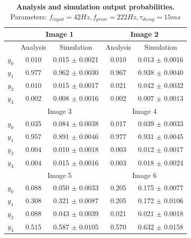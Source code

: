 \begin{table}[]
\label{tab:1D_42_222_15}
\small
\tabcolsep=0.11cm
\begin{tabular}{|c|cc|cc|}
\hline
                       & \multicolumn{2}{c|}{Image 1}                       & \multicolumn{2}{c|}{Image 2}                       \\ \hline
                       & \multicolumn{1}{c|}{Analysis} & Simulation         & \multicolumn{1}{c|}{Analysis} & Simulation         \\ \hline
$y_0$                  & \multicolumn{1}{c|}{0.010}    & 0.015 $\pm$ 0.0021 & \multicolumn{1}{c|}{0.010}    & 0.013 $\pm$ 0.0016 \\ \hline
$y_1$                  & \multicolumn{1}{c|}{0.977}    & 0.962 $\pm$ 0.0030 & \multicolumn{1}{c|}{0.967}    & 0.938 $\pm$ 0.0040 \\ \hline
$y_2$                  & \multicolumn{1}{c|}{0.010}    & 0.015 $\pm$ 0.0017 & \multicolumn{1}{c|}{0.021}    & 0.042 $\pm$ 0.0032 \\ \hline
$y_3$                  & \multicolumn{1}{c|}{0.002}    & 0.008 $\pm$ 0.0016 & \multicolumn{1}{c|}{0.002}    & 0.007 $\pm$ 0.0013 \\ \hline
                       & \multicolumn{2}{c|}{Image 3}                       & \multicolumn{2}{c|}{Image 4}                       \\ \hline
$y_0$                  & \multicolumn{1}{c|}{0.035}    & 0.084 $\pm$ 0.0038 & \multicolumn{1}{c|}{0.017}    & 0.039 $\pm$ 0.0033 \\ \hline
$y_1$                  & \multicolumn{1}{c|}{0.957}    & 0.891 $\pm$ 0.0046 & \multicolumn{1}{c|}{0.977}    & 0.931 $\pm$ 0.0045 \\ \hline
$y_2$                  & \multicolumn{1}{c|}{0.004}    & 0.010 $\pm$ 0.0018 & \multicolumn{1}{c|}{0.003}    & 0.012 $\pm$ 0.0017 \\ \hline
$y_3$                  & \multicolumn{1}{c|}{0.004}    & 0.015 $\pm$ 0.0016 & \multicolumn{1}{c|}{0.003}    & 0.018 $\pm$ 0.0024 \\ \hline
						& \multicolumn{2}{c|}{Image 5}                       & \multicolumn{2}{c|}{Image 6}                       \\ \hline
$y_0$                  & \multicolumn{1}{c|}{0.088}    & 0.050 $\pm$ 0.0033 & \multicolumn{1}{c|}{0.205}    & 0.175 $\pm$ 0.0077 \\ \hline
$y_1$                  & \multicolumn{1}{c|}{0.308}    & 0.321 $\pm$ 0.0087 & \multicolumn{1}{c|}{0.205}    & 0.172 $\pm$ 0.0106 \\ \hline
$y_2$                  & \multicolumn{1}{c|}{0.088}    & 0.043 $\pm$ 0.0039 & \multicolumn{1}{c|}{0.021}    & 0.021 $\pm$ 0.0018 \\ \hline
$y_3$                  & \multicolumn{1}{c|}{0.515}    & 0.587 $\pm$ 0.0105 & \multicolumn{1}{c|}{0.570}    & 0.632 $\pm$ 0.0158 \\ \hline
\end{tabular}
\caption{\textbf{Analysis and simulation output probabilities. } Parameters: $f_{input} = 42 Hz, f_{prior} = 222 Hz, \tau_{decay} = 15 ms$}
\end{table}

